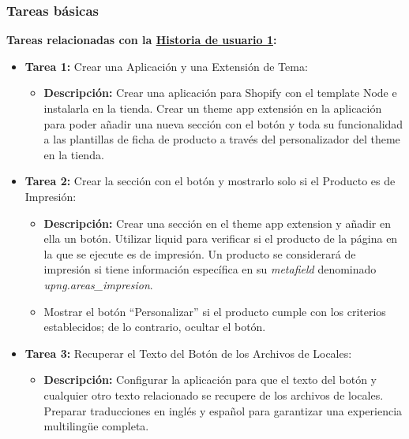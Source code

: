 \documentclass[11pt]{article}
\begin{document}
\subsubsection{Tareas básicas}

\textbf{Tareas relacionadas con la \hyperref[sec:historia1]{Historia de usuario 1}:}
\begin{itemize}
    \item \textbf{Tarea 1:} Crear una Aplicación y una Extensión de Tema:
          \begin{itemize}[label=--]
              \item \textbf{Descripción:} Crear una aplicación para Shopify con el template Node e instalarla en la tienda. Crear un theme app extensión en la aplicación para poder añadir una nueva sección con el botón y toda su funcionalidad a las plantillas de ficha de producto a través del personalizador del theme en la tienda.
          \end{itemize}
    \item \textbf{Tarea 2:} Crear la sección con el botón y mostrarlo solo si el Producto es de Impresión:
          \begin{itemize}[label=--]
              \item \textbf{Descripción:} Crear una sección en el theme app extension y añadir en ella un botón. Utilizar liquid para verificar si el producto de la página en la que se ejecute es de impresión. Un producto se considerará de impresión si tiene información específica en su \textit{metafield} denominado \textit{upng.areas\_impresion}.
              \item Mostrar el botón ``Personalizar'' si el producto cumple con los criterios establecidos; de lo contrario, ocultar el botón.
          \end{itemize}
    \item \textbf{Tarea 3:} Recuperar el Texto del Botón de los Archivos de Locales:
          \begin{itemize}[label=--]
              \item \textbf{Descripción:} Configurar la aplicación para que el texto del botón y cualquier otro texto relacionado se recupere de los archivos de locales. Preparar traducciones en inglés y español para garantizar una experiencia multilingüe completa.
          \end{itemize}
\end{itemize}
\end{document}
